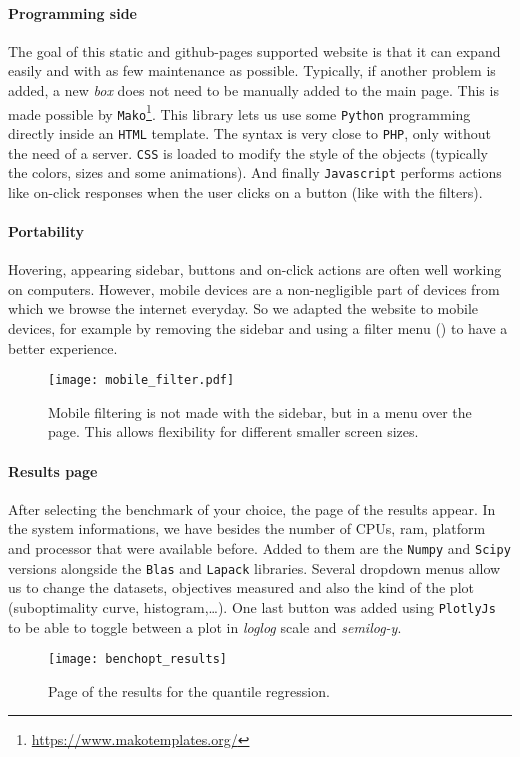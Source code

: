 \documentclass[../main.tex]{subfiles}
\begin{document}
\paragraph*{Programming side}
%
The goal of this static and github-pages supported website is that it can expand easily
and with as few maintenance as possible.
Typically, if another problem is added, a new \emph{box} does not need
to be manually added to the main page.
This is made possible by \texttt{Mako}\footnote{\url{https://www.makotemplates.org/}}.
This library lets us use some \texttt{Python} programming directly inside an
\texttt{HTML} template.
The syntax is very close to \texttt{PHP}, only without the need of a server.
\texttt{CSS} is loaded to modify the style of the objects (typically the colors,
sizes and some animations).
And finally \texttt{Javascript} performs actions like on-click responses when
the user clicks on a button (like with the filters).
%
\paragraph*{Portability}
%
Hovering, appearing sidebar, buttons and on-click actions are often well working
on computers.
However, mobile devices are a non-negligible part of devices from
which we browse the internet everyday.
So we adapted the website to mobile devices, for example by removing the sidebar
and using a filter menu () to have a better experience.
\begin{figure}[h]
    \centering
    \texttt{[image: mobile\_filter.pdf]}
    \caption{Mobile filtering is not made with the sidebar, but in a menu over
    the page. This allows flexibility for different smaller screen sizes.}
    \label{fig:mobile_filter}
\end{figure}
%
\paragraph*{Results page}
%
After selecting the benchmark of your choice, the page of the results appear.
In the system informations, we have besides the number of CPUs, ram, platform
and processor that were available before.
Added to them are the \texttt{Numpy} and \texttt{Scipy} versions alongside
the \texttt{Blas} and \texttt{Lapack} libraries.
Several dropdown menus allow us to change the datasets, objectives measured and
also the kind of the plot (suboptimality curve, histogram,\dots).
One last button was added using \texttt{PlotlyJs} to be able to toggle
between a plot in \emph{loglog} scale and \emph{semilog-y}.
\begin{figure}[h]
    \centering
    \texttt{[image: benchopt\_results]}
    \caption{Page of the results for the quantile regression.}
    \label{fig:benchopt_quantile_reg}
\end{figure}
\end{document}

